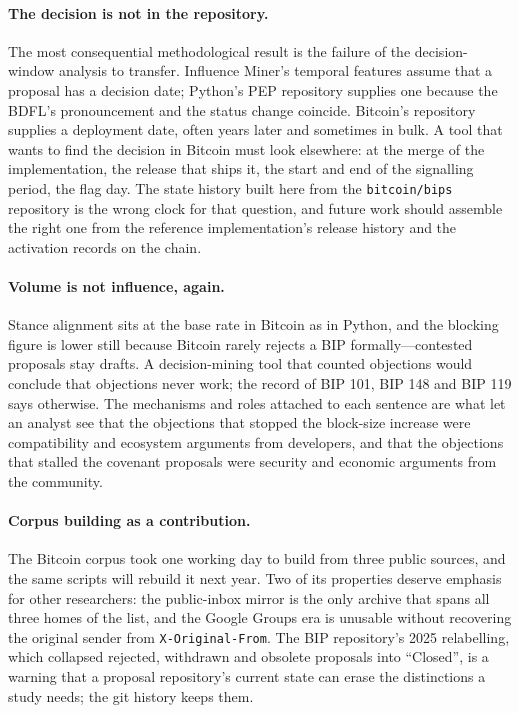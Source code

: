 \paragraph{The decision is not in the repository.} The most consequential methodological result is the failure of the decision-window analysis to transfer. Influence Miner's temporal features assume that a proposal has a decision date; Python's PEP repository supplies one because the BDFL's pronouncement and the status change coincide. Bitcoin's repository supplies a deployment date, often years later and sometimes in bulk. A tool that wants to find the decision in Bitcoin must look elsewhere: at the merge of the implementation, the release that ships it, the start and end of the signalling period, the flag day. The state history built here from the \texttt{bitcoin/bips} repository is the wrong clock for that question, and future work should assemble the right one from the reference implementation's release history and the activation records on the chain.

\paragraph{Volume is not influence, again.} Stance alignment sits at the base rate in Bitcoin as in Python, and the blocking figure is lower still because Bitcoin rarely rejects a BIP formally---contested proposals stay drafts. A decision-mining tool that counted objections would conclude that objections never work; the record of BIP 101, BIP 148 and BIP 119 says otherwise. The mechanisms and roles attached to each sentence are what let an analyst see that the objections that stopped the block-size increase were compatibility and ecosystem arguments from developers, and that the objections that stalled the covenant proposals were security and economic arguments from the community.

\paragraph{Corpus building as a contribution.} The Bitcoin corpus took one working day to build from three public sources, and the same scripts will rebuild it next year. Two of its properties deserve emphasis for other researchers: the public-inbox mirror is the only archive that spans all three homes of the list, and the Google Groups era is unusable without recovering the original sender from \texttt{X-Original-From}. The BIP repository's 2025 relabelling, which collapsed rejected, withdrawn and obsolete proposals into ``Closed'', is a warning that a proposal repository's current state can erase the distinctions a study needs; the git history keeps them.

